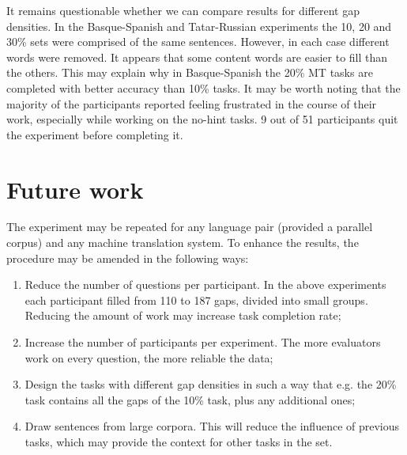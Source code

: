 \documentclass[11pt]{article}
\begin{document}
It remains questionable whether we can compare results for different gap densities. In the
Basque-Spanish and Tatar-Russian experiments the 10, 20 and 30\% sets were comprised
of the same sentences. However, in each case different words were removed. It appears
that some content words are easier to fill than the others. This may explain why in
Basque-Spanish the 20\% MT tasks are completed with better accuracy than 10\% tasks.
It may be worth noting that the majority of the participants reported feeling frustrated in
the course of their work, especially while working on the no-hint tasks. 9 out of 51
participants quit the experiment before completing it.

\section{Future work}
\label{sec:futurework}
The experiment may be repeated for any language pair (provided a parallel corpus) and
any machine translation system. To enhance the results, the procedure may be amended
in the following ways:
\begin{enumerate}
\item  Reduce the number of questions per participant. In the above experiments each
participant filled from 110 to 187 gaps, divided into small groups. Reducing the
amount of work may increase task completion rate;
\item  Increase the number of participants per experiment. The more evaluators work on
every question, the more reliable the data;
\item  Design the tasks with different gap densities in such a way that e.g. the 20\% task
contains all the gaps of the 10\% task, plus any additional ones;
\item  Draw sentences from large corpora. This will reduce the influence of previous
tasks, which may provide the context for other tasks in the set.
\end{enumerate}





\end{document}
